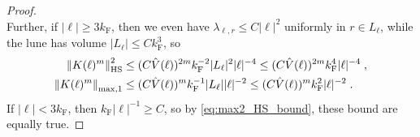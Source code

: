 \documentclass[sn-mathphys, Numbered ,a4paper]{sn-jnl}%
\newcommand{\F}{\mathrm{F}}
\theoremstyle{plain}
\theoremstyle{definition}
\theoremstyle{remark}
\theoremstyle{plain}
\theoremstyle{definition}
\theoremstyle{remark}
\begin{document}
\begin{proof}
\begin{equation}
\end{equation}
Further, if $ |\ell| \ge 3 k_{\F} $, then we even have $ \lambda_{\ell,r} \le C |\ell|^2 $ uniformly in $ r \in L_\ell $, while the lune has volume $ |L_\ell| \le C k_{\F}^3 $, so
\begin{align}
	\norm{K(\ell)^m}_{\mathrm{HS}}^2
	&\le (C \hat{V}(\ell))^{2m} k_{\F}^{-2} |L_\ell|^2 |\ell|^{-4}
	\le (C \hat{V}(\ell))^{2m} k_{\F}^4 |\ell|^{-4} \;,\\
	\norm{K(\ell)^m}_{\mathrm{max,1}}
	&\le (C \hat{V}(\ell))^{m} k_{\F}^{-1} |L_\ell| |\ell|^{-2}
	\le (C \hat{V}(\ell))^{m} k_{\F}^2 |\ell|^{-2} \;.
\end{align}
If $ |\ell| < 3 k_{\F} $, then $ k_{\F} |\ell|^{-1} \ge C $, so by \eqref{eq:max2_HS_bound}, these bound are equally true.
\end{proof}
\end{document}
